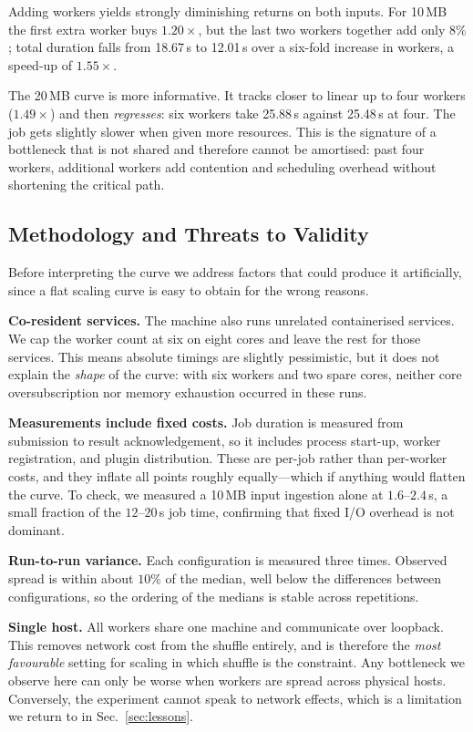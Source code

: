 \documentclass[conference]{IEEEtran}
\begin{document}
Adding workers yields strongly diminishing returns on both inputs. For
10\,MB the first extra worker buys $1.20\times$, but the last two workers
together add only $8\%$; total duration falls from 18.67\,s to 12.01\,s over
a six-fold increase in workers, a speed-up of $1.55\times$.

The 20\,MB curve is more informative. It tracks closer to linear up to four
workers ($1.49\times$) and then \emph{regresses}: six workers take 25.88\,s
against 25.48\,s at four. The job gets slightly slower when given more
resources. This is the signature of a bottleneck that is not shared and
therefore cannot be amortised: past four workers, additional workers add
contention and scheduling overhead without shortening the critical path.

\subsection{Methodology and Threats to Validity}

Before interpreting the curve we address factors that could produce it
artificially, since a flat scaling curve is easy to obtain for the wrong
reasons.

\textbf{Co-resident services.} The machine also runs unrelated containerised
services. We cap the worker count at six on eight cores and leave the rest
for those services. This means absolute timings are slightly pessimistic,
but it does not explain the \emph{shape} of the curve: with six workers and
two spare cores, neither core oversubscription nor memory exhaustion
occurred in these runs.

\textbf{Measurements include fixed costs.} Job duration is measured from
submission to result acknowledgement, so it includes process start-up,
worker registration, and plugin distribution. These are per-job rather than
per-worker costs, and they inflate all points roughly equally---which if
anything would flatten the curve. To check, we measured a 10\,MB input
ingestion alone at $1.6$--$2.4$\,s, a small fraction of the $12$--$20$\,s
job time, confirming that fixed I/O overhead is not dominant.

\textbf{Run-to-run variance.} Each configuration is measured three times.
Observed spread is within about $10\%$ of the median, well below the
differences between configurations, so the ordering of the medians is
stable across repetitions.

\textbf{Single host.} All workers share one machine and communicate over
loopback. This removes network cost from the shuffle entirely, and is
therefore the \emph{most favourable} setting for scaling in which shuffle
is the constraint. Any bottleneck we observe here can only be worse when
workers are spread across physical hosts. Conversely, the experiment cannot
speak to network effects, which is a limitation we return to in
Sec.~\ref{sec:lessons}.
\end{document}
